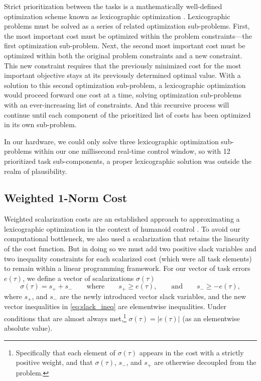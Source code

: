 \documentclass[utf8]{frontiersSCNS}
\renewcommand*{\cite}[1]{\citep{#1}}
\begin{document}
Strict prioritization between the tasks is a mathematically well-defined optimization scheme known as lexicographic optimization \cite{BouyarmaneKheddar2017TAC}. %
Lexicographic problems must be solved as a series of related optimization sub-problems. First, the most important cost must be optimized within the problem constraints---the first optimization sub-problem. Next, the second most important cost must be optimized within both the original problem constraints and a new constraint.
This new constraint requires that the previously minimized cost for the most important objective stays at its previously determined optimal value.
With a solution to this second optimization sub-problem, a lexicographic optimization would proceed forward one cost at a time, solving optimization sub-problems with an ever-increasing list of constraints.
And this recursive process will continue until each component of the prioritized list of costs has been optimized in its own sub-problem.%

In our hardware, we could only solve three lexicographic optimization sub-problems within our one millisecond real-time control window, so with 12 prioritized task sub-components, a proper lexicographic solution was outside the realm of plausibility.


\subsection{Weighted 1-Norm Cost}\label{sec:cost_approx}
Weighted scalarization costs are an established approach to approximating a lexicographic optimization in the context of humanoid control \cite{BouyarmaneKheddar2017TAC}. To avoid our computational bottleneck, we also used a scalarization that retains the linearity of the cost function. But in doing so we must add two positive slack variables and two inequality constraints for each scalarized cost (which were all task elements) to remain within a linear programming framework. For our vector of task errors $e(\tau)$, we define a vector of scalarizations $\sigma(\tau)$
\begin{equation}
\sigma(\tau) = s_+ + s_-\qquad\text{where}\qquad s_+\geq e(\tau),\qquad \mathrm{and}\qquad s_- \geq -e(\tau),\label{eq:slack_ineq}
\end{equation}
where $s_+$, and $s_-$ are the newly introduced vector slack variables, and the new vector inequalities in \eqref{eq:slack_ineq} are elementwise inequalities.
Under conditions that are almost always met,\footnote{Specifically that each element of $\sigma(\tau)$ appears in the cost with a strictly positive weight, and that $\sigma(\tau)$, $s_-$, and $s_+$ are otherwise decoupled from the problem.} $\sigma(\tau) = |e(\tau)|$ (as an elementwise absolute value).
\end{document}

